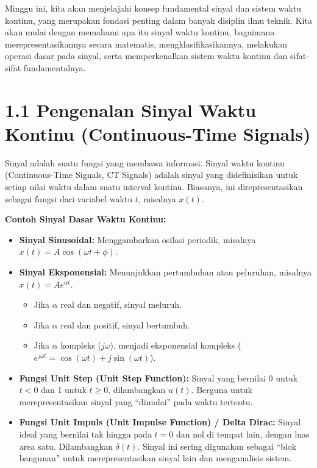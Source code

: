 \documentclass[
  letterpaper,
  DIV=11,
  numbers=noendperiod]{scrreprt}
\providecommand{\tightlist}{%
  \setlength{\itemsep}{0pt}\setlength{\parskip}{0pt}}\usepackage{longtable,booktabs,array}
\begin{document}
Minggu ini, kita akan menjelajahi konsep fundamental sinyal dan sistem
waktu kontinu, yang merupakan fondasi penting dalam banyak disiplin ilmu
teknik. Kita akan mulai dengan memahami apa itu sinyal waktu kontinu,
bagaimana merepresentasikannya secara matematis, mengklasifikasikannya,
melakukan operasi dasar pada sinyal, serta memperkenalkan sistem waktu
kontinu dan sifat-sifat fundamentalnya.

\section{1.1 Pengenalan Sinyal Waktu Kontinu (Continuous-Time
Signals)}\label{pengenalan-sinyal-waktu-kontinu-continuous-time-signals}

Sinyal adalah suatu fungsi yang membawa informasi. Sinyal waktu kontinu
(Continuous-Time Signals, CT Signals) adalah sinyal yang didefinisikan
untuk setiap nilai waktu dalam suatu interval kontinu. Biasanya, ini
direpresentasikan sebagai fungsi dari variabel waktu \(t\), misalnya
\(x(t)\).

\textbf{Contoh Sinyal Dasar Waktu Kontinu:}

\begin{itemize}
\tightlist
\item
  \textbf{Sinyal Sinusoidal:} Menggambarkan osilasi periodik, misalnya
  \(x(t) = A \cos(\omega t + \phi)\).
\item
  \textbf{Sinyal Eksponensial:} Menunjukkan pertumbuhan atau peluruhan,
  misalnya \(x(t) = A e^{\alpha t}\).

  \begin{itemize}
  \tightlist
  \item
    Jika \(\alpha\) real dan negatif, sinyal meluruh.
  \item
    Jika \(\alpha\) real dan positif, sinyal bertumbuh.
  \item
    Jika \(\alpha\) kompleks (\(j\omega\)), menjadi eksponensial
    kompleks (\(e^{j\omega t} = \cos(\omega t) + j\sin(\omega t)\)).
  \end{itemize}
\item
  \textbf{Fungsi Unit Step (Unit Step Function):} Sinyal yang bernilai 0
  untuk \(t<0\) dan 1 untuk \(t \ge 0\), dilambangkan \(u(t)\). Berguna
  untuk merepresentasikan sinyal yang ``dimulai'' pada waktu tertentu.
\item
  \textbf{Fungsi Unit Impuls (Unit Impulse Function) / Delta Dirac:}
  Sinyal ideal yang bernilai tak hingga pada \(t=0\) dan nol di tempat
  lain, dengan luas area satu. Dilambangkan \(\delta(t)\). Sinyal ini
  sering digunakan sebagai ``blok bangunan'' untuk merepresentasikan
  sinyal lain dan menganalisis sistem.
\end{itemize}
\end{document}
